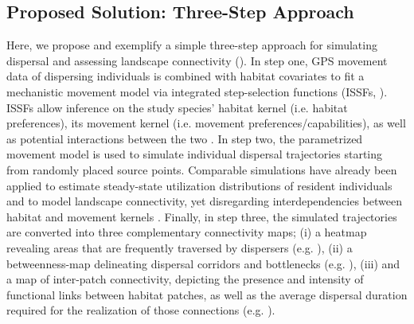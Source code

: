 \documentclass[abstract=on,10pt,a4paper,bibliography=totocnumbered]{article}
\begin{document}
\subsection{Proposed Solution: Three-Step Approach}
Here, we propose and exemplify a simple three-step approach for simulating
dispersal and assessing landscape connectivity (). In
step one, GPS movement data of dispersing individuals is combined with habitat
covariates to fit a mechanistic movement model via integrated step-selection
functions (ISSFs, \citealp{Avgar.2016}). ISSFs allow inference on the study
species' habitat kernel (i.e. habitat preferences), its movement kernel (i.e.
movement preferences/capabilities), as well as potential interactions between
the two \citep{Avgar.2016, Fieberg.2021}. In step two, the parametrized movement
model is used to simulate individual dispersal trajectories starting from
randomly placed source points. Comparable simulations have already been applied
to estimate steady-state utilization distributions of resident individuals
\citep{Potts.2013, Signer.2017} and to model landscape connectivity, yet
disregarding interdependencies between habitat and movement kernels
\citep{Clark.2015, Zeller.2020}. Finally, in step three, the simulated
trajectories are converted into three complementary connectivity maps; (i) a
heatmap revealing areas that are frequently traversed by dispersers (e.g.
\citealp{Hauenstein.2019, Zeller.2020}), (ii) a betweenness-map delineating
dispersal corridors and bottlenecks (e.g. \citealp{BastilleRousseau.2018}),
(iii) and a map of inter-patch connectivity, depicting the presence and
intensity of functional links between habitat patches, as well as the average
dispersal duration required for the realization of those connections (e.g.
\citealp{Gustafson.1996, Kanagaraj.2013}).


\end{document}
